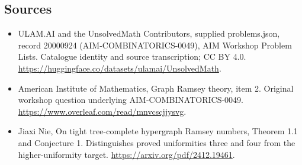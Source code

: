 \documentclass[11pt,a4paper]{article}
\begin{document}
\subsection{Sources}
\begin{itemize}
\item[S1] ULAM.AI and the UnsolvedMath Contributors, supplied problems.json, record 20000924 (AIM-COMBINATORICS-0049), AIM Workshop Problem Lists. Catalogue identity and source transcription; CC BY 4.0.
\url{https://huggingface.co/datasets/ulamai/UnsolvedMath}.
\item[S2] American Institute of Mathematics, Graph Ramsey theory, item 2. Original workshop question underlying AIM-COMBINATORICS-0049.
\url{https://www.overleaf.com/read/mnvcscjjysvg}.
\item[S3] Jiaxi Nie, On tight tree-complete hypergraph Ramsey numbers, Theorem 1.1 and Conjecture 1. Distinguishes proved uniformities three and four from the higher-uniformity target.
\url{https://arxiv.org/pdf/2412.19461}.
\end{itemize}
\end{document}
